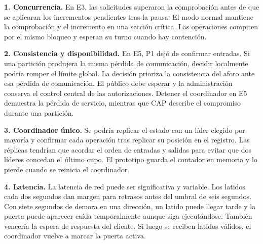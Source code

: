 \documentclass[11pt,a4paper]{article}
\begin{document}
\textbf{1. Concurrencia.}
En E3, las solicitudes superaron la comprobación antes de que se aplicaran
los incrementos pendientes tras la pausa. El modo normal mantiene la
comprobación y el incremento en una sección crítica. Las operaciones
compiten por el mismo bloqueo y esperan su turno cuando hay contención.

\textbf{2. Consistencia y disponibilidad.}
En E5, P1 dejó de confirmar entradas. Si una partición produjera la misma
pérdida de comunicación, decidir localmente podría romper el límite global.
La decisión prioriza la consistencia del aforo ante esa pérdida de
comunicación. El público debe esperar y la administración conserva el
control central de las autorizaciones. Detener el coordinador en E5
demuestra la pérdida de servicio, mientras que CAP describe el compromiso
durante una partición.

\textbf{3. Coordinador único.}
Se podría replicar el estado con un líder elegido por mayoría y confirmar
cada operación tras replicar su posición en el registro. Las réplicas
tendrían que acordar el orden de entradas y salidas para evitar que dos
líderes concedan el último cupo. El prototipo guarda el contador en
memoria y lo pierde cuando se reinicia el coordinador.

\textbf{4. Latencia.}
La latencia de red puede ser significativa y variable. Los latidos
cada dos segundos dan margen para retrasos antes del umbral de seis
segundos. Con siete segundos de demora en una dirección, un latido
puede llegar tarde y la puerta puede aparecer caída temporalmente
aunque siga ejecutándose. También vencería la espera de respuesta del
cliente. Si luego se reciben latidos válidos, el coordinador vuelve a
marcar la puerta activa.
\end{document}
